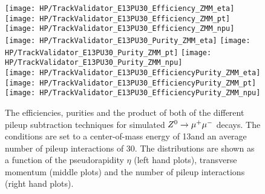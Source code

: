 \begin{figure}[!t]
    \centering
    \texttt{[image: HP/TrackValidator\_E13PU30\_Efficiency\_ZMM\_eta]}
    \texttt{[image: HP/TrackValidator\_E13PU30\_Efficiency\_ZMM\_pt]}
    \texttt{[image: HP/TrackValidator\_E13PU30\_Efficiency\_ZMM\_npu]}
    \\
    \texttt{[image: HP/TrackValidator\_E13PU30\_Purity\_ZMM\_eta]}
    \texttt{[image: HP/TrackValidator\_E13PU30\_Purity\_ZMM\_pt]}
    \texttt{[image: HP/TrackValidator\_E13PU30\_Purity\_ZMM\_npu]}
    \\
    \texttt{[image: HP/TrackValidator\_E13PU30\_EfficiencyPurity\_ZMM\_eta]}
    \texttt{[image: HP/TrackValidator\_E13PU30\_EfficiencyPurity\_ZMM\_pt]}
    \texttt{[image: HP/TrackValidator\_E13PU30\_EfficiencyPurity\_ZMM\_npu]}
    \caption[Purities, efficiencies and their product of the different pileup subtraction techniques based on simulated $\Zz\rightarrow\MM$ decays with 13\TeV and $\left<PU\right>=30$]{The efficiencies, purities and the product of both of the different pileup subtraction techniques for simulated $\Zz\rightarrow\MM$ decays. The conditions are set to a center-of-mass energy of 13\TeV and an average number of pileup interactions of 30. The distributions are shown as a function of the pseudorapidity $\eta$ (left hand plots), transverse momentum (middle plots) and the number of pileup interactions (right hand plots). \label{plot:HPUTAE13PU30ZtomumuComp}}
\end{figure}

